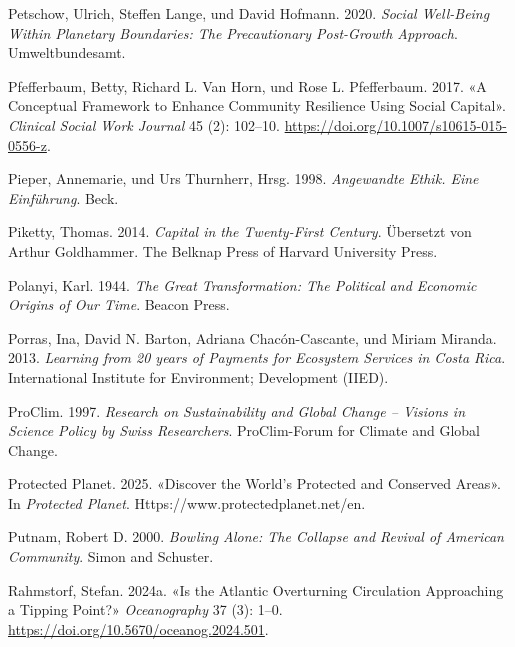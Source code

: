 \documentclass[
  nswissgerman,
  a4paper,
  DIV=11,
  numbers=noendperiod,
  oneside,
  openany]{scrreprt}
\newlength{\cslhangindent}
\newenvironment{CSLReferences}[2] %
 {\begin{list}{}{%
  \setlength{\itemindent}{0pt}
  \setlength{\leftmargin}{0pt}
  \setlength{\parsep}{0pt}
  \ifodd #1
   \setlength{\leftmargin}{\cslhangindent}
   \setlength{\itemindent}{-1\cslhangindent}
  \fi
  \setlength{\itemsep}{#2\baselineskip}}}
 {\end{list}}
\begin{document}
\begin{CSLReferences}{1}{1}
Petschow, Ulrich, Steffen Lange, und David Hofmann. 2020. \emph{Social
{Well-Being Within Planetary Boundaries}: The {Precautionary Post-Growth
Approach}}. Umweltbundesamt.

Pfefferbaum, Betty, Richard L. Van Horn, und Rose L. Pfefferbaum. 2017.
{«A {Conceptual Framework} to {Enhance Community Resilience Using Social
Capital}»}. \emph{Clinical Social Work Journal} 45 (2): 102--10.
\url{https://doi.org/10.1007/s10615-015-0556-z}.

Pieper, Annemarie, und Urs Thurnherr, Hrsg. 1998. \emph{Angewandte
{Ethik}. {Eine} {Einführung}}. Beck.

Piketty, Thomas. 2014. \emph{Capital in the {Twenty-First Century}}.
Übersetzt von Arthur Goldhammer. The Belknap Press of Harvard University
Press.

Polanyi, Karl. 1944. \emph{The {Great Transformation}: {The Political}
and {Economic Origins} of {Our Time}}. Beacon Press.

Porras, Ina, David N. Barton, Adriana Chacón-Cascante, und Miriam
Miranda. 2013. \emph{Learning from 20 years of {Payments} for
{Ecosystem} {Services} in {Costa} {Rica}}. International Institute for
Environment; Development (IIED).

ProClim. 1997. \emph{Research on {Sustainability} and {Global Change} --
{Visions} in {Science Policy} by {Swiss Researchers}}. {ProClim-Forum
for Climate and Global Change}.

Protected Planet. 2025. {«Discover the World's Protected and Conserved
Areas»}. In \emph{Protected Planet}. Https://www.protectedplanet.net/en.

Putnam, Robert D. 2000. \emph{Bowling {Alone}: {The Collapse} and
{Revival} of {American Community}}. {Simon and Schuster}.

Rahmstorf, Stefan. 2024a. {«Is the {Atlantic Overturning Circulation
Approaching} a {Tipping Point}?»} \emph{Oceanography} 37 (3): 1--0.
\url{https://doi.org/10.5670/oceanog.2024.501}.


\end{CSLReferences}
\end{document}
